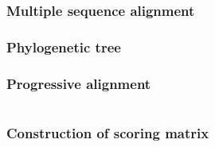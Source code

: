 \documentclass[12pt]{article}
\begin{document}
\newpage

%
%
\part{}

%
%
\setcounter{figure}{0}
\setcounter{table}{0}
\section{Multiple sequence alignment}



\newpage

%
%
\setcounter{figure}{0}
\setcounter{table}{0}
\section{Phylogenetic tree}






\newpage

%
%
\setcounter{section}{9}
\setcounter{figure}{0}
\setcounter{table}{0}
\section{Progressive alignment}





\newpage

%
%
\part{}

%
%
\setcounter{figure}{0}
\setcounter{table}{0}
\section{Construction of scoring matrix}





\newpage

%
%
\setcounter{figure}{0}
\setcounter{table}{0}
\end{document}
